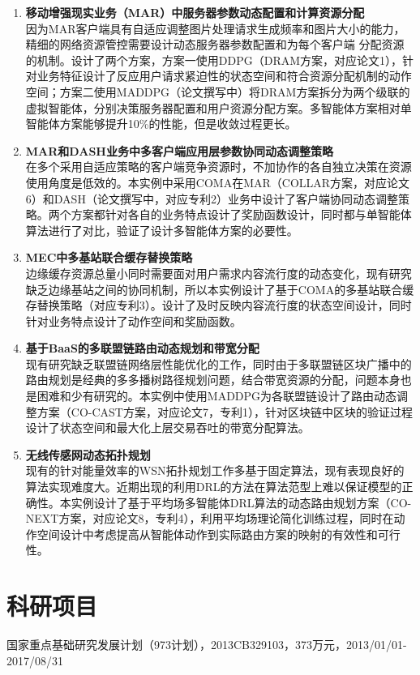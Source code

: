 \documentclass{resume}
\begin{document}
\begin{enumerate}
  \item \textbf{移动增强现实业务（MAR）中服务器参数动态配置和计算资源分配}
  \\ 因为MAR客户端具有自适应调整图片处理请求生成频率和图片大小的能力，精细的网络资源管控需要设计动态服务器参数配置和为每个客户端 分配资源的机制。设计了两个方案，方案一使用DDPG（DRAM方案，对应论文1），针对业务特征设计了反应用户请求紧迫性的状态空间和符合资源分配机制的动作空间；方案二使用MADDPG（论文撰写中）将DRAM方案拆分为两个级联的虚拟智能体，分别决策服务器配置和用户资源分配方案。多智能体方案相对单智能体方案能够提升10\%的性能，但是收敛过程更长。
  \item \textbf{MAR和DASH业务中多客户端应用层参数协同动态调整策略} 
  \\ 在多个采用自适应策略的客户端竞争资源时，不加协作的各自独立决策在资源使用角度是低效的。本实例中采用COMA在MAR（COLLAR方案，对应论文6）和DASH（论文撰写中，对应专利2）业务中设计了客户端协同动态调整策略。两个方案都针对各自的业务特点设计了奖励函数设计，同时都与单智能体算法进行了对比，验证了设计多智能体方案的必要性。
  \item \textbf{MEC中多基站联合缓存替换策略} 
  \\ 边缘缓存资源总量小同时需要面对用户需求内容流行度的动态变化，现有研究缺乏边缘基站之间的协同机制，所以本实例设计了基于COMA的多基站联合缓存替换策略（对应专利3）。设计了及时反映内容流行度的状态空间设计，同时针对业务特点设计了动作空间和奖励函数。
  \item  \textbf{基于BaaS的多联盟链路由动态规划和带宽分配}
  \\ 现有研究缺乏联盟链网络层性能优化的工作，同时由于多联盟链区块广播中的路由规划是经典的多多播树路径规划问题，结合带宽资源的分配，问题本身也是困难和少有研究的。本实例中使用MADDPG为各联盟链设计了路由动态调整方案（CO-CAST方案，对应论文7，专利1），针对区块链中区块的验证过程设计了状态空间和最大化上层交易吞吐的带宽分配算法。
  \item \textbf{无线传感网动态拓扑规划}
  \\ 现有的针对能量效率的WSN拓扑规划工作多基于固定算法，现有表现良好的算法实现难度大。近期出现的利用DRL的方法在算法范型上难以保证模型的正确性。本实例设计了基于平均场多智能体DRL算法的动态路由规划方案（CO-NEXT方案，对应论文8，专利4），利用平均场理论简化训练过程，同时在动作空间设计中考虑提高从智能体动作到实际路由方案的映射的有效性和可行性。
\end{enumerate}
\section{\faUsers 科研项目}
国家重点基础研究发展计划（973计划），2013CB329103，373万元，2013/01/01-2017/08/31
\end{document}
